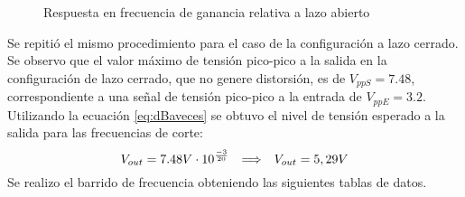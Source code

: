 \begin{figure}[H]
    \centering
    
    \caption{Respuesta en frecuencia de ganancia relativa a lazo abierto}
    \label{fig:RFA}
\end{figure}
Se repitió el mismo procedimiento para el caso de la configuración a lazo cerrado. Se observo que el valor máximo de tensión pico-pico a la salida en la configuración de lazo cerrado, que no genere distorsión, es de  $V_{ppS}=7.48$, correspondiente a una señal de tensión pico-pico a la entrada de $V_{ppE}=3.2$. Utilizando la ecuación \ref{eq:dBaveces} se obtuvo el nivel de tensión esperado a la salida para las frecuencias de corte:
\begin{equation}
    V_{out}=7.48V\cdot10^{\frac{-3}{20}}\hspace{0.25cm} \Longrightarrow \hspace{0.25cm} V_{out}=5,29V
\end{equation}
Se realizo el barrido de frecuencia obteniendo las siguientes tablas de datos.
